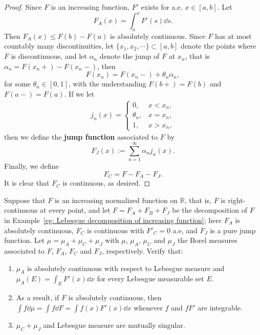 \begin{proof}
  Since $F$ is an increasing function, $F'$ exists for a.e. $x \in [a, b]$.
  Let 
  \[
  F_A(x) = \int_a^xF'(s)\dd s.
  \]
  Then $F_A(x) \leq F(b) - F(a)$ is absolutely continuous.
  Since $F$ has at most countably many discontinuities, 
  let $\{x_1, x_2,\cdots\}\subset[a,b]$ denote the points where $F$ is discontinuous,
  and let $\alpha_n$ denote the jump of $F$ at $x_n$,
  that is $\alpha_n = F(x_n+) - F(x_n-)$,
  then  
  \[
  F(x_n) = F(x_n-) + \theta_n\alpha_n,
  \]
  for some $\theta_n\in[0,1]$,
  with the understanding $F(b+) = F(b)$ and $F(a-) = F(a)$.
  If we let 
  \begin{align*}
    j_n(x) = 
    \begin{cases}
      0, & x<x_n,\\
      \theta_n, & x=x_n,\\
      1, & x>x_n,
    \end{cases}
  \end{align*}
  then we define the \textbf{jump function} associated to $F$ by 
  \[
  F_J(x) := \sum_{n=1}^\infty \alpha_n j_n(x).
  \]
  Finally, we define 
  \[
  F_C = F - F_A - F_J.
  \]
  It is clear that $F_C$ is continuous, as desired.
\end{proof}

\begin{example}
  Suppose that $F$ is an increasing normalized function on $\mathbb R$,
  that is, $F$ is right-continuous at every point,
  and let $F = F_A + F_B + F_J$ be the decomposition of $F$ in Example~\ref*{eg: Lebesgue decomposition of increasing function};
  here $F_A$ is absolutely continuous, $F_C$ is continuous with $F'_C = 0$ a.e, and $F_J$ is a pure jump function.
  Let $\mu = \mu_A + \mu_C + \mu_J$ with $\mu$, $\mu_A$, $\mu_C$ and $\mu_J$ the Borel measures associated to $F$, $F_A$, $F_C$ and $F_J$, respectively.
  Verify that:
  \begin{enumerate}
    \item $\mu_A$ is absolutely continuous with respect to Lebesgue measure and $\mu_A(E) = \int_EF'(x)\dd x$ for every Lebesgue measurable set $E$.
    \item As a result, if $F$ is absolutely continuous, then $\int f\dd\mu = \int f\dd F = \int f(x)F'(x)\dd x$ whenever $f$ and $fF'$ are integrable.
    \item $\mu_C + \mu_J$ and Lebesgue measure are mutually singular.
  \end{enumerate}
\end{example}


